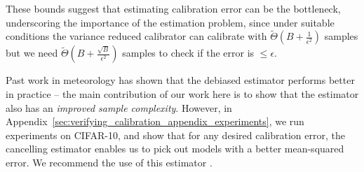 These bounds suggest that estimating calibration error can be the bottleneck, underscoring the importance of the estimation problem, since under suitable conditions\pl{,} the variance reduced calibrator can calibrate with $\widetilde{\Theta}(B + \frac{1}{\epsilon^2})$ samples but we need $\widetilde{\Theta}(B + \frac{\sqrt{B}}{\epsilon^2})$ samples to check if the error is $\leq \epsilon$.

Past work in meteorology has shown that the debiased estimator performs better in practice -- the main contribution of our work here is to show that the estimator also has an \emph{improved sample complexity}. However, in Appendix~\ref{sec:verifying_calibration_appendix_experiments}, we run experiments on CIFAR-10, and show that for any desired calibration error, the cancelling  estimator enables us to pick out models with a better mean-squared error. We recommend the use of this estimator .





